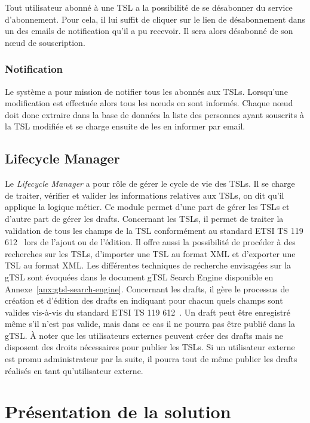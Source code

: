 \documentclass{tnreport}
\begin{document}
Tout utilisateur abonné à une TSL a la possibilité de se désabonner du service d'abonnement. Pour cela, il lui suffit de cliquer sur le lien de désabonnement dans un des emails de notification qu'il a pu recevoir. Il sera alors désabonné de son nœud de souscription.

\subsubsection{Notification}

Le système a pour mission de notifier tous les abonnés aux TSLs. Lorsqu'une modification est effectuée alors tous les nœuds en sont informés. Chaque nœud doit donc extraire dans la base de données la liste des personnes ayant souscrits à la TSL modifiée et se charge ensuite de les en informer par email.

\subsection{Lifecycle Manager}

Le \textit{Lifecycle Manager} a pour rôle de gérer le cycle de vie des TSLs. Il se charge de traiter, vérifier et valider les informations relatives aux TSLs, on dit qu'il applique la logique métier. Ce module permet d'une part de gérer les TSLs et d'autre part de gérer les drafts. Concernant les TSLs, il permet de traiter la validation de tous les champs de la TSL conformément au standard ETSI TS 119 612~\cite{ETSITS119612} lors de l'ajout ou de l'édition. Il offre aussi la possibilité de procéder à des recherches sur les TSLs, d'importer une TSL au format XML et d'exporter une TSL au format XML. Les différentes techniques de recherche envisagées sur la gTSL sont évoquées dans le document gTSL Search Engine disponible en Annexe~\ref{anx:gtsl-search-engine}. Concernant les drafts, il gère le processus de création et d'édition des drafts en indiquant pour chacun quels champs sont valides vis-à-vis du standard ETSI TS 119 612~\cite{ETSITS119612}. Un draft peut être enregistré même s'il n'est pas valide, mais dans ce cas il ne pourra pas être publié dans la gTSL. À noter que les utilisateurs externes peuvent créer des drafts mais ne disposent des droits nécessaires pour publier les TSLs. Si un utilisateur externe est promu administrateur par la suite, il pourra tout de même publier les drafts réalisés en tant qu'utilisateur externe.

\section{Présentation de la solution}
\end{document}
